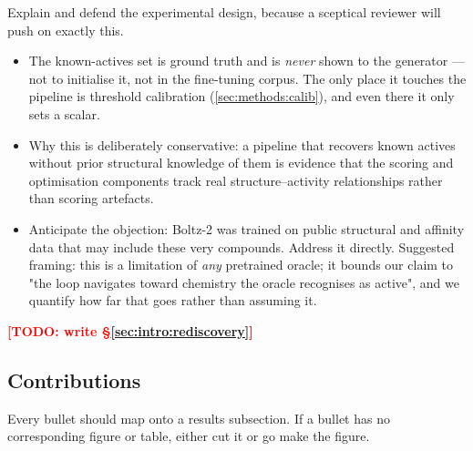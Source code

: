 \documentclass[11pt]{article}
\newcommand{\TODO}[1]{\textcolor{red}{\textbf{[TODO: #1]}}}
\begin{document}
\begin{yourturn}
Explain and defend the experimental design, because a sceptical reviewer will
push on exactly this.
\begin{itemize}\itemsep0pt
  \item The known-actives set is ground truth and is \emph{never} shown to the
        generator --- not to initialise it, not in the fine-tuning corpus. The
        only place it touches the pipeline is threshold calibration
        (\cref{sec:methods:calib}), and even there it only sets a scalar.
  \item Why this is deliberately conservative: a pipeline that recovers known
        actives without prior structural knowledge of them is evidence that the
        scoring and optimisation components track real structure--activity
        relationships rather than scoring artefacts.
  \item Anticipate the objection: Boltz-2 was trained on public structural and
        affinity data that may include these very compounds. Address it
        directly. Suggested framing: this is a limitation of \emph{any}
        pretrained oracle; it bounds our claim to "the loop navigates toward
        chemistry the oracle recognises as active", and we quantify how far
        that goes rather than assuming it.
\end{itemize}
\end{yourturn}

\TODO{write \S\ref{sec:intro:rediscovery}}

\subsection{Contributions}
\label{sec:intro:contrib}

\begin{guide}
Every bullet should map onto a results subsection. If a bullet has no
corresponding figure or table, either cut it or go make the figure.
\end{guide}
\end{document}
